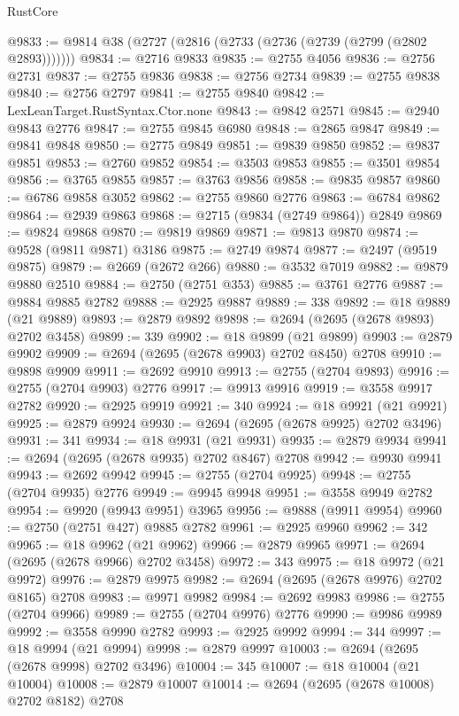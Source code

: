 \begin{lexlean}{RustCore}
\begin{coremodule}
@9833 := @9814 @38 (@2727 (@2816 (@2733 (@2736 (@2739 (@2799 (@2802 @2893)))))))
@9834 := @2716 @9833
@9835 := @2755 @4056
@9836 := @2756 @2731
@9837 := @2755 @9836
@9838 := @2756 @2734
@9839 := @2755 @9838
@9840 := @2756 @2797
@9841 := @2755 @9840
@9842 := LexLeanTarget.RustSyntax.Ctor.none
@9843 := @9842 @2571
@9845 := @2940 @9843 @2776
@9847 := @2755 @9845 @6980
@9848 := @2865 @9847
@9849 := @9841 @9848
@9850 := @2775 @9849
@9851 := @9839 @9850
@9852 := @9837 @9851
@9853 := @2760 @9852
@9854 := @3503 @9853
@9855 := @3501 @9854
@9856 := @3765 @9855
@9857 := @3763 @9856
@9858 := @9835 @9857
@9860 := @6786 @9858 @3052
@9862 := @2755 @9860 @2776
@9863 := @6784 @9862
@9864 := @2939 @9863
@9868 := @2715 (@9834 (@2749 @9864)) @2849
@9869 := @9824 @9868
@9870 := @9819 @9869
@9871 := @9813 @9870
@9874 := @9528 (@9811 @9871) @3186
@9875 := @2749 @9874
@9877 := @2497 (@9519 @9875)
@9879 := @2669 (@2672 @266)
@9880 := @3532 @7019
@9882 := @9879 @9880 @2510
@9884 := @2750 (@2751 @353)
@9885 := @3761 @2776
@9887 := @9884 @9885 @2782
@9888 := @2925 @9887
@9889 := 338
@9892 := @18 @9889 (@21 @9889)
@9893 := @2879 @9892
@9898 := @2694 (@2695 (@2678 @9893) @2702 @3458)
@9899 := 339
@9902 := @18 @9899 (@21 @9899)
@9903 := @2879 @9902
@9909 := @2694 (@2695 (@2678 @9903) @2702 @8450) @2708
@9910 := @9898 @9909
@9911 := @2692 @9910
@9913 := @2755 (@2704 @9893)
@9916 := @2755 (@2704 @9903) @2776
@9917 := @9913 @9916
@9919 := @3558 @9917 @2782
@9920 := @2925 @9919
@9921 := 340
@9924 := @18 @9921 (@21 @9921)
@9925 := @2879 @9924
@9930 := @2694 (@2695 (@2678 @9925) @2702 @3496)
@9931 := 341
@9934 := @18 @9931 (@21 @9931)
@9935 := @2879 @9934
@9941 := @2694 (@2695 (@2678 @9935) @2702 @8467) @2708
@9942 := @9930 @9941
@9943 := @2692 @9942
@9945 := @2755 (@2704 @9925)
@9948 := @2755 (@2704 @9935) @2776
@9949 := @9945 @9948
@9951 := @3558 @9949 @2782
@9954 := @9920 (@9943 @9951) @3965
@9956 := @9888 (@9911 @9954)
@9960 := @2750 (@2751 @427) @9885 @2782
@9961 := @2925 @9960
@9962 := 342
@9965 := @18 @9962 (@21 @9962)
@9966 := @2879 @9965
@9971 := @2694 (@2695 (@2678 @9966) @2702 @3458)
@9972 := 343
@9975 := @18 @9972 (@21 @9972)
@9976 := @2879 @9975
@9982 := @2694 (@2695 (@2678 @9976) @2702 @8165) @2708
@9983 := @9971 @9982
@9984 := @2692 @9983
@9986 := @2755 (@2704 @9966)
@9989 := @2755 (@2704 @9976) @2776
@9990 := @9986 @9989
@9992 := @3558 @9990 @2782
@9993 := @2925 @9992
@9994 := 344
@9997 := @18 @9994 (@21 @9994)
@9998 := @2879 @9997
@10003 := @2694 (@2695 (@2678 @9998) @2702 @3496)
@10004 := 345
@10007 := @18 @10004 (@21 @10004)
@10008 := @2879 @10007
@10014 := @2694 (@2695 (@2678 @10008) @2702 @8182) @2708

\end{coremodule}
\end{lexlean}

